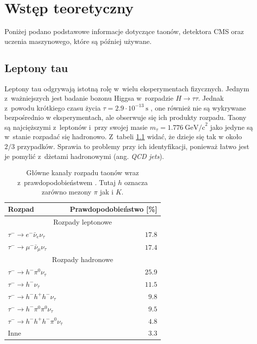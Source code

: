 \documentclass{pracalicmgr}
\begin{document}
    \chapter{Wstęp teoretyczny}
    \label{ch:wstep}
	Poniżej podano podstawowe informacje dotyczące taonów, detektora CMS oraz uczenia maszynowego, które są później używane.
	
    \section{Leptony tau}
    Leptony tau	odgrywają istotną rolę w~wielu eksperymentach fizycznych. Jednym z~ważniejszych jest badanie bozonu Higgsa w~rozpadzie $H \rightarrow \tau\tau$. Jednak z~powodu krótkiego czasu życia $\tau = 2.9 \cdot 10^{-13}~\mathrm{s}$ \cite{particle_physics}, one również nie są wykrywane bezpośrednio w eksperymentach, ale obserwuje się ich produkty rozpadu. Taony są najcięższymi z~leptonów i~przy swojej masie $m_\tau = 1.776 ~\mathrm{GeV/c}^2$ \cite{particle_physics} jako jedyne są w~stanie rozpadać się hadronowo. Z~tabeli \ref{tab:kanaly_rozpadu} widać, że dzieje się tak w około $2/3$ przypadków. Sprawia to problemy przy ich identyfikacji, ponieważ łatwo jest je pomylić z~dżetami hadronowymi (ang. \textit{QCD jets}).
    
	\begin{table}[H]
	\centering
	\caption{Główne kanały rozpadu taonów wraz z~prawdopodobieństwem \cite{tauid13, particle_physics}. Tutaj $h$ oznacza zarówno mezony $\pi$ jak i $K$.}
	\label{tab:kanaly_rozpadu}
	\begin{tabular}{lr}
	\toprule
	Rozpad & Prawdopodobieństwo [\%] \\
	\midrule
	\multicolumn{2}{c}{Rozpady leptonowe} \\
	\midrule
	$\tau^- \rightarrow e^-\bar{\nu}_{e}\nu_{\tau}$ & $17.8$ \\
	$\tau^- \rightarrow \mu^-\bar{\nu}_{\mu}\nu_{\tau}$ & $17.4$ \\
	\midrule
	\multicolumn{2}{c}{Rozpady hadronowe} \\
	\midrule
	$\tau^- \rightarrow h^- \pi^0 \nu_{\tau}$ & $25.9$ \\
	$\tau^- \rightarrow h^-\nu_{\tau}$ & $11.5$ \\
	$\tau^- \rightarrow h^- h^+ h^- \nu_{\tau}$ & $9.8$ \\
	$\tau^- \rightarrow h^- \pi^0 \pi^0 \nu_{\tau}$ & $9.5$ \\
	$\tau^- \rightarrow h^- h^+ h^- \pi^0 \nu_{\tau}$ & $4.8$ \\
	Inne & $3.3$ \\	
	\bottomrule
	\end{tabular}
	\end{table}
    \newpage
\end{document}
